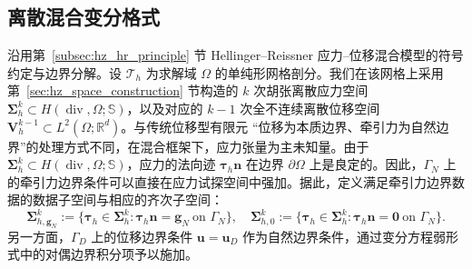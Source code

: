 \subsection{离散混合变分格式}
\label{subsec:hz_discrete_form}

沿用第~\ref{subsec:hz_hr_principle} 节 Hellinger–Reissner 应力--位移混合模型的符号约定与边界分解。设 $\mathcal{T}_h$ 为求解域 $\Omega$ 的单纯形网格剖分。我们在该网格上采用第~\ref{sec:hz_space_construction} 节构造的 $k$ 次胡张离散应力空间 $\boldsymbol{\Sigma}_h^k\subset H(\operatorname{div},\Omega;\mathbb{S})$，以及对应的 $k-1$ 次全不连续离散位移空间 $\boldsymbol{V}_h^{k-1}\subset L^2(\Omega;\mathbb{R}^d)$。与传统位移型有限元 “位移为本质边界、牵引力为自然边界”的处理方式不同，在混合框架下，应力张量为主未知量。由于 $\boldsymbol{\Sigma}_h^k\subset H(\operatorname{div},\Omega;\mathbb{S})$，应力的法向迹 $\boldsymbol{\tau}_h\boldsymbol{n}$ 在边界 $\partial\Omega$ 上是良定的。因此，$\Gamma_N$ 上的牵引力边界条件可以直接在应力试探空间中强加。据此，定义满足牵引力边界数据的数据子空间与相应的齐次子空间：
\[
\boldsymbol{\Sigma}_{h,\boldsymbol{g}_N}^k := \{\boldsymbol{\tau}_h\in\boldsymbol{\Sigma}_h^k:\boldsymbol{\tau}_h\boldsymbol{n}=\boldsymbol{g}_N\ \text{on }\Gamma_N\},\quad \boldsymbol{\Sigma}_{h,0}^k := \{\boldsymbol{\tau}_h\in\boldsymbol{\Sigma}_h^k:\boldsymbol{\tau}_h\boldsymbol{n}=\boldsymbol{0}\ \text{on }\Gamma_N\}.
\]
另一方面，$\Gamma_D$ 上的位移边界条件 $\boldsymbol{u}=\boldsymbol{u}_D$ 作为自然边界条件，通过变分方程弱形式中的对偶边界积分项予以施加。

